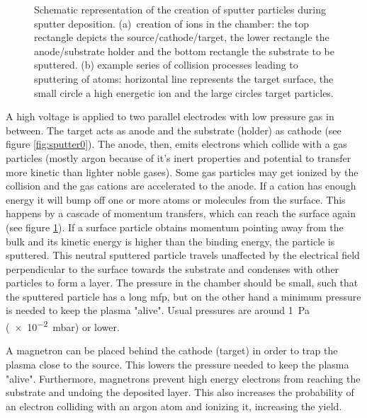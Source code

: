 \begin{figure}[htb]
\begin{subfigure}[t]{.3\textwidth}
        \caption{}
        \label{fig:sputter1}
    \end{subfigure}
    \caption{Schematic representation of the creation of sputter particles during sputter deposition. 
    (a)~creation of ions in the chamber: 
        the top rectangle depicts the source/cathode/target, 
        the lower rectangle the anode/substrate holder and 
        the bottom rectangle the substrate to be sputtered. 
    (b) example series of collision processes leading to sputtering of atoms: 
        horizontal line represents the target surface, 
        the small circle a high energetic ion and 
        the large circles target particles. 
    }
	\label{fig:sputter}
\end{figure}

A high voltage is applied to 
two parallel electrodes with low pressure gas in between. 
The target acts as anode and the substrate (holder) as cathode (see figure \ref{fig:sputter0}).
The anode, then, emits electrons which collide with a gas particles (mostly argon because of it's inert properties and potential to transfer more kinetic than lighter noble gases). 
Some gas particles may get ionized by the collision and the gas cations are accelerated to the anode. 
If a cation has enough energy it will bump off one or more atoms or molecules from the surface. 
This happens by a cascade of momentum transfers, which can reach the surface again (see figure \ref{fig:sputter1}). 
If a surface particle obtains momentum pointing away from the bulk and its kinetic energy is higher than the binding energy, the particle is sputtered. 
This neutral sputtered particle travels unaffected by the electrical field perpendicular to the surface towards the substrate and condenses with other particles to form a layer.
The pressure in the chamber should be small, such that the sputtered particle has a long \gls{mfp}, but on the other hand 
a minimum pressure is needed to keep the plasma "alive". 
Usual pressures are around \SI{1}{\Pa} (\num{e-2}\SI{}{\milli\bar}) or lower\cite{Swann1988}.

A magnetron can be placed behind the cathode (target) in order to trap the plasma close to the source. 
This lowers the pressure needed to keep the plasma "alive". 
Furthermore, magnetrons prevent high energy electrons from reaching the substrate and 
undoing the deposited layer.
This also increases the probability of an electron 
colliding with an argon atom and ionizing it, increasing the yield.

